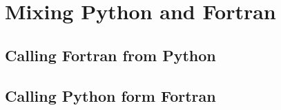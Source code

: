 

\chapter{Mixing Python and Fortran} 

\section{Calling Fortran from Python} 

\section{Calling Python form Fortran}


